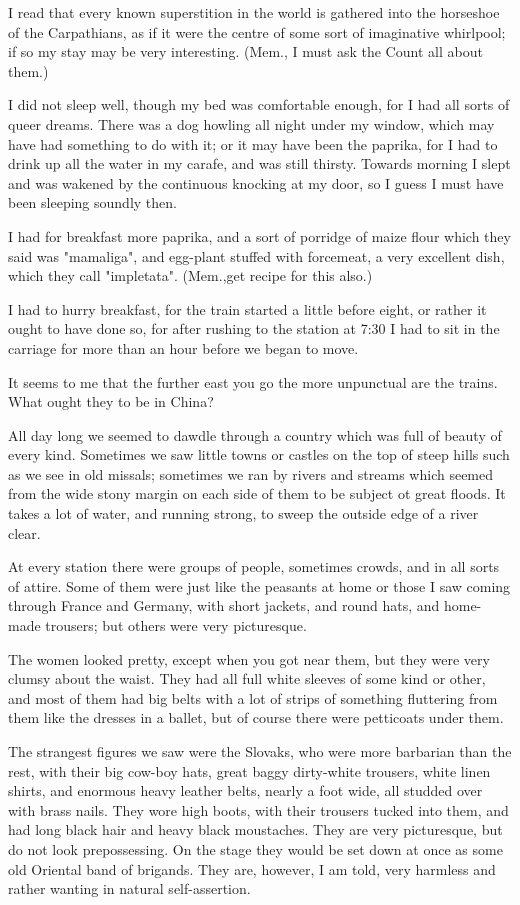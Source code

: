 I read that every known superstition in the world is gathered into the horseshoe of the Carpathians, as if it were the centre of some sort of imaginative whirlpool; if so my stay may be very interesting. (Mem., I must ask the Count all about them.) 

I did not sleep well, though my bed was comfortable enough, for I had all sorts of queer dreams. There was a dog howling all night under my window, which may have had something to do with it; or it may have been the paprika, for I had to drink up all the water in my carafe, and was still thirsty. Towards morning I slept and was wakened by the continuous knocking at my door, so I guess I must have been sleeping soundly then. 

I had for breakfast more paprika, and a sort of porridge of maize flour which they said was "mamaliga", and egg-plant stuffed with forcemeat, a very excellent dish, which they call "impletata". (Mem.,get recipe for this also.) 

I had to hurry breakfast, for the train started a little before eight, or rather it ought to have done so, for after rushing to the station at 7:30 I had to sit in the carriage for more than an hour before we began to move. 

It seems to me that the further east you go the more unpunctual are the trains. What ought they to be in China? 

All day long we seemed to dawdle through a country which was full of beauty of every kind. Sometimes we saw little towns or castles on the top of steep hills such as we see in old missals; sometimes we ran by rivers and streams which seemed from the wide stony margin on each side of them to be subject ot great floods. It takes a lot of water, and running strong, to sweep the outside edge of a river clear. 

At every station there were groups of people, sometimes crowds, and in all sorts of attire. Some of them were just like the peasants at home or those I saw coming through France and Germany, with short jackets, and round hats, and home-made trousers; but others were very picturesque. 

The women looked pretty, except when you got near them, but they were very clumsy about the waist. They had all full white sleeves of some kind or other, and most of them had big belts with a lot of strips of something fluttering from them like the dresses in a ballet, but of course there were petticoats under them. 

The strangest figures we saw were the Slovaks, who were more barbarian than the rest, with their big cow-boy hats, great baggy dirty-white trousers, white linen shirts, and enormous heavy leather belts, nearly a foot wide, all studded over with brass nails. They wore high boots, with their trousers tucked into them, and had long black hair and heavy black moustaches. They are very picturesque, but do not look prepossessing. On the stage they would be set down at once as some old Oriental band of brigands. They are, however, I am told, very harmless and rather wanting in natural self-assertion. 

